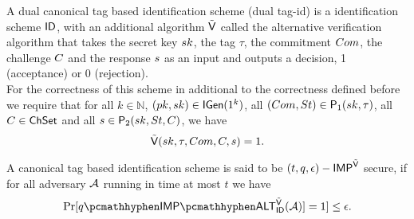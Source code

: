 \begin{definition}
A dual canonical tag based identification scheme (dual tag-id) is a identification scheme $\mathsf{ID}$, with an additional algorithm $\tilde{\mathsf{V}}$ called the alternative verification algorithm that takes the secret key $sk$, the tag $\tau$, the commitment $Com$, the challenge $C$ and the response $s$ as an input and outputs a decision, 1 (acceptance) or 0 (rejection).
\\
For the correctness of this scheme in additional to the correctness defined before we require that for all $k \in \mathbb{N}$,
$(pk,sk) \in \mathsf{IGen}(1^k)$,
all
$(Com,St) \in \mathsf{P}_1(sk, \tau)$,
all $C \in \mathsf{ChSet}$ and all 
$s \in \mathsf{P}_2(sk,St,C)$,
we have
$$ \tilde{\mathsf{V}}(sk,\tau,Com,C,s) = 1.$$
\end{definition}

\begin{definition}
A canonical tag based identification scheme is said to be $(t,q,\epsilon)-\mathsf{IMP}^{\tilde{\mathsf{V}}}$ secure, if for all adversary $\mathcal{A}$ running in time at most $t$ we have
$$\Pr[q\hyph\xsoundness^{\IDAltV}_{\ID}(\adv)]=1] \leq \epsilon.$$
\end{definition}



\begin{figure}[htb!]
    \centering
    \nicoresetlinenr
    \caption{}
    \label{fig:x-soundess}
\end{figure}





